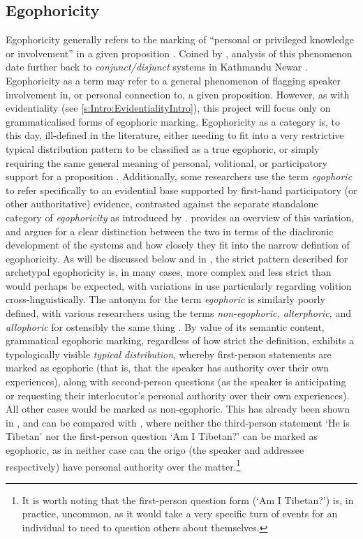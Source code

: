 \subsection{Egophoricity}\label{s:Intro:EgophoricityIntro}
Egophoricity generally refers to the marking of ``personal or privileged knowledge or involvement'' in a given proposition \cite[2]{EgoIntro}. Coined by , analysis of this phenomenon date further back to \textit{conjunct/disjunct} systems in Kathmandu Newar \cite[Newaric: Nepal, ][]{HaleNewar1980}. Egophoricity as a term may refer to a general phenomenon of flagging speaker involvement in, or personal connection to, a given proposition. However, as with evidentiality (see \ref{s:Intro:EvidentialityIntro}), this project will focus only on grammaticalised forms of egophoric marking. Egophoricity as a category is, to this day, ill-defined in the literature, either needing to fit into a very restrictive typical distribution pattern to be classified as a true egophoric, or simply requiring the same general meaning of personal, volitional, or participatory support for a proposition \cites{EgoIntro}{Gawne2017}. Additionally, some researchers use the term \textit{egophoric} to refer specifically to an evidential base supported by first-hand participatory (or other authoritative) evidence, contrasted against the separate standalone category of \textit{egophoricity} as introduced by .  provides an overview of this variation, and argues for a clear distinction between the two in terms of the diachronic development of the systems and how closely they fit into the narrow defintion of egophoricity. As will be discussed below and in , the strict pattern described for archetypal egophoricity is, in many cases, more complex and less strict than would perhaps be expected, with variations in use particularly regarding volition cross-linguistically. The antonym for the term \textit{egophoric} is similarly poorly defined, with various researchers using the terms \textit{non-egophoric, alterphoric,} and \textit{allophoric} for ostensibly the same thing \cite{Widmer2020}. By value of its semantic content, grammatical egophoric marking, regardless of how strict the definition, exhibits a typologically visible \textit{typical distribution}, whereby first-person statements are marked as egophoric (that is, that the speaker has authority over their own experiences), along with second-person questions (as the speaker is anticipating or requesting their interlocutor's personal authority over their own experiences). All other cases would be marked as non-egophoric. This has already been shown in , and can be compared with , where neither the third-person statement `He is Tibetan' nor the first-person question `Am I Tibetan?' can be marked as egophoric, as in neither case can the origo (the speaker and addressee respectively) have personal authority over the matter.\footnote{It is worth noting that the first-person question form (`Am I Tibetan?') is, in practice, uncommon, as it would take a very specific turn of events for an individual to need to question others about themselves.}

